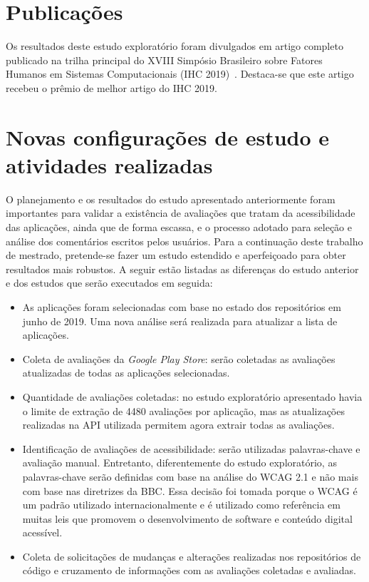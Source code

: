\section{Publicações}

Os resultados deste estudo exploratório foram divulgados em artigo completo publicado na trilha principal do XVIII Simpósio Brasileiro sobre Fatores Humanos em Sistemas Computacionais (IHC 2019)~\cite{ihc2019}. Destaca-se que este artigo recebeu o prêmio de melhor artigo do IHC 2019. 

\section{Novas configurações de estudo e atividades realizadas}

O planejamento e os resultados do estudo apresentado anteriormente foram importantes para validar a existência de avaliações que tratam da acessibilidade das aplicações, ainda que de forma escassa, e o processo adotado para seleção e análise dos comentários escritos pelos usuários. 
Para a continuação deste trabalho de mestrado, pretende-se fazer um estudo estendido e aperfeiçoado para obter resultados mais robustos. A seguir estão listadas as diferenças do estudo anterior e dos estudos que serão executados em seguida:
\begin{itemize}
 \item As aplicações foram selecionadas com base no estado dos repositórios em junho de 2019. Uma nova análise será realizada para atualizar a lista de aplicações.
 \item Coleta de avaliações da \textit{Google Play Store}: serão coletadas as avaliações atualizadas de todas as aplicações selecionadas.
 \item Quantidade de avaliações coletadas: no estudo exploratório apresentado havia o limite de extração de 4480 avaliações por aplicação, mas as atualizações realizadas na API utilizada permitem agora extrair todas as avaliações.
 \item Identificação de avaliações de acessibilidade: serão utilizadas palavras-chave e avaliação manual. Entretanto, diferentemente do estudo exploratório, as palavras-chave serão definidas com base na análise do WCAG 2.1 e não mais com base nas diretrizes da BBC. Essa decisão foi tomada porque o WCAG é um padrão utilizado internacionalmente e é utilizado como referência em muitas leis que promovem o desenvolvimento de software e conteúdo digital acessível. 
 \item Coleta de solicitações de mudanças e alterações realizadas nos repositórios de código e cruzamento de informações com as avaliações coletadas e avaliadas.
 
\end{itemize}



